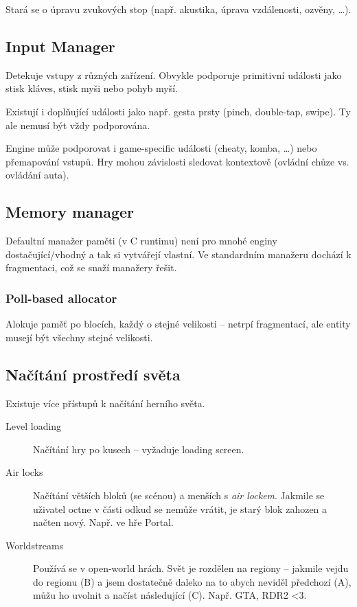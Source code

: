 Stará se o úpravu zvukových stop (např. akustika, úprava vzdálenosti, ozvěny, \dots).

\subsection*{Input Manager}

Detekuje vstupy z různých zařízení.
Obvykle podporuje primitivní události jako stisk kláves, stisk myši nebo pohyb myší.

Existují i doplňující události jako např. gesta prsty (pinch, double-tap, swipe).
Ty ale nemusí být vždy podporována.

Engine může podporovat i game-specific události (cheaty, komba, \dots) nebo přemapování vstupů.
Hry mohou závislosti sledovat kontextově (ovládní chůze vs. ovládání auta).

\subsection*{Memory manager}

Defaultní manažer paměti (v C runtimu) není pro mnohé enginy dostačující/vhodný a tak si vytvářejí vlastní.
Ve standardním manažeru dochází k fragmentaci, což se snaží manažery řešit.

\subsubsection*{Poll-based allocator}

Alokuje paměť po blocích, každý o stejné velikosti -- netrpí fragmentací, ale entity musejí být všechny stejné velikosti.


\subsection*{Načítání prostředí světa}

Existuje více přístupů k načítání herního světa.

\begin{description}
    \item[Level loading] Načítání hry po kusech -- vyžaduje loading screen.
    \item[Air locks] Načítání větších bloků (se scénou) a menších s \textit{air lockem}. Jakmile se uživatel octne v části odkud se nemůže vrátit, je starý blok zahozen a načten nový. Např. ve hře Portal.
    \item[Worldstreams] Používá se v open-world hrách. Svět je rozdělen na regiony -- jakmile vejdu do regionu (B) a jsem dostatečně daleko na to abych neviděl předchozí (A), můžu ho uvolnit a načíst následující (C). Např. GTA, RDR2 <3.
\end{description}
